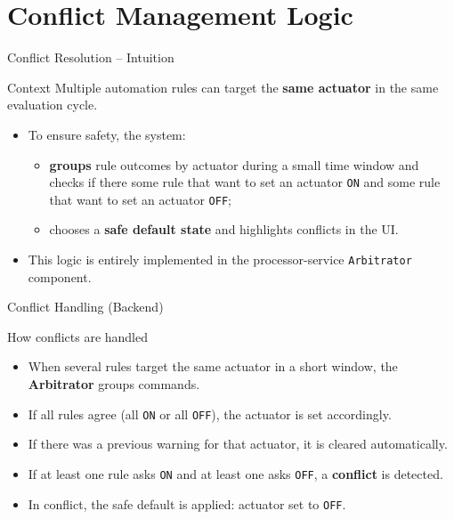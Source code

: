 \documentclass[aspectratio=169]{beamer}
\begin{document}
\section{Conflict Management Logic}

\begin{frame}[t]{Conflict Resolution -- Intuition}
  \small
  \begin{block}{Context}
    Multiple automation rules can target the \textbf{same actuator} in the same evaluation cycle.
  \end{block}
  \vspace{0.3cm}
  \begin{itemize}
    \item To ensure safety, the system:
      \begin{itemize}
        \item \textbf{groups} rule outcomes by actuator during a small time window and checks if there some rule that want to set an actuator \texttt{ON} and some rule that want to set an actuator \texttt{OFF};
        \item chooses a \textbf{safe default state} and highlights conflicts in the UI.
      \end{itemize}
    \item This logic is entirely implemented in the processor-service \texttt{Arbitrator} component.
  \end{itemize}
\end{frame}

\begin{frame}[t]{Conflict Handling (Backend)}
  \begin{block}{How conflicts are handled}
    \begin{itemize}
      \item When several rules target the same actuator in a short window, the \textbf{Arbitrator} groups commands.
      \item If all rules agree (all \texttt{ON} or all \texttt{OFF}), the actuator is set accordingly.
      \item If there was a previous warning for that actuator, it is cleared automatically.
      \item If at least one rule asks \texttt{ON} and at least one asks \texttt{OFF}, a \textbf{conflict} is detected.
      \item In conflict, the safe default is applied: actuator set to \texttt{OFF}.
    \end{itemize}
  \end{block}
\end{frame}
\end{document}
